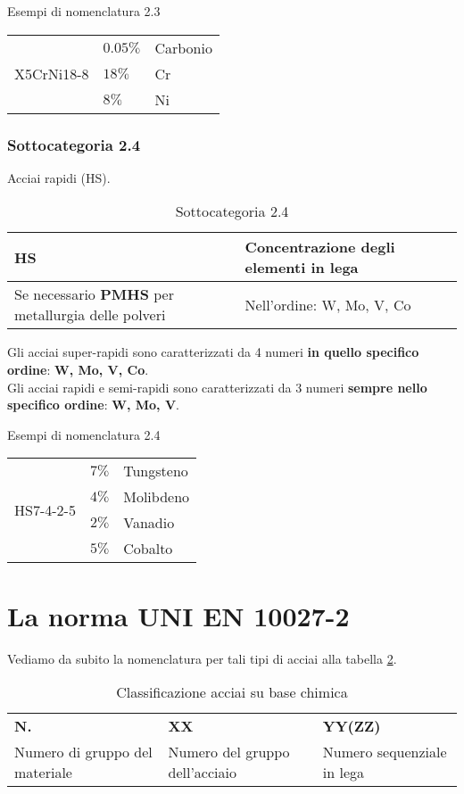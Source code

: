 \begin{example}{Esempi di nomenclatura 2.3}
\begin{tabularx}{\textwidth}{XXX}
\multirow{3}{*}{X5CrNi18-8} & $0.05\%$ & Carbonio\\
	& $18\%$ & Cr\\
	& $8\%$ & Ni\\
\end{tabularx}
\end{example}

\subsubsection{Sottocategoria 2.4}\label{sssc:Sottogruppo2.4}
Acciai rapidi (HS).

\begin{table}
\centering
\caption{Sottocategoria 2.4}\label{tab:Sotto4}
\begin{tabularx}{\textwidth}{|X|X|}
\toprule
\textbf{HS} & \textbf{Concentrazione degli elementi in lega}\\
\midrule
Se necessario \textbf{PMHS} per metallurgia delle polveri &
Nell'ordine: W, Mo, V, Co\\
\bottomrule
\end{tabularx}
\end{table}
Gli acciai super-rapidi sono caratterizzati da 4 numeri \textbf{in quello specifico ordine}: \textbf{W, Mo, V, Co}.\\
Gli acciai rapidi e semi-rapidi sono caratterizzati da 3 numeri \textbf{sempre nello specifico ordine}: \textbf{W, Mo, V}.\\

\begin{example}{Esempi di nomenclatura 2.4}
\begin{tabularx}{\textwidth}{XXX}
\multirow{4}{*}{HS7-4-2-5} & $7\%$ & Tungsteno\\
	& $4\%$ & Molibdeno\\
	& $2\%$ & Vanadio\\
	& $5\%$ & Cobalto\\
\end{tabularx}
\end{example}

\section{La norma UNI EN 10027-2}\label{sc:10027-2s}
Vediamo da subito la nomenclatura per tali tipi di acciai alla tabella \ref{tab:ClassParte2}.
\begin{table}
\centering
\caption{Classificazione acciai su base chimica}
\label{tab:ClassParte2}
\begin{tabularx}{\textwidth}{|X|X|X|}
\toprule
\textbf{N.} & \textbf{XX} & \textbf{YY(ZZ)}\\
Numero di gruppo del materiale & Numero del gruppo dell'acciaio & Numero sequenziale in lega\\
\bottomrule
\end{tabularx}
\end{table}

